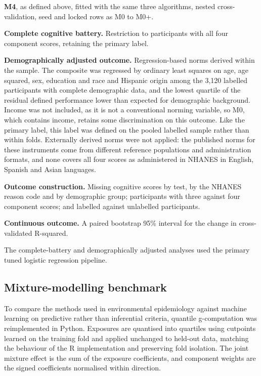 \documentclass[12pt]{article}
\begin{document}
\textbf{M4}, as defined above, fitted with the same three algorithms, nested cross-validation, seed and locked rows as M0 to M0+.

\textbf{Complete cognitive battery.} Restriction to participants with all four component scores, retaining the primary label.

\textbf{Demographically adjusted outcome.} Regression-based norms derived within the sample. The composite was regressed by ordinary least squares on age, age squared, sex, education and race and Hispanic origin among the 3,120 labelled participants with complete demographic data, and the lowest quartile of the residual defined performance lower than expected for demographic background. Income was not included, as it is not a conventional norming variable, so M0, which contains income, retains some discrimination on this outcome. Like the primary label, this label was defined on the pooled labelled sample rather than within folds. Externally derived norms were not applied: the published norms for these instruments come from different reference populations and administration formats, and none covers all four scores as administered in NHANES in English, Spanish and Asian languages.

\textbf{Outcome construction.} Missing cognitive scores by test, by the NHANES reason code and by demographic group; participants with three against four component scores; and labelled against unlabelled participants.

\textbf{Continuous outcome.} A paired bootstrap 95\% interval for the change in cross-validated R-squared.

The complete-battery and demographically adjusted analyses used the primary tuned logistic regression pipeline.

\subsection*{Mixture-modelling benchmark}

To compare the methods used in environmental epidemiology against machine learning on predictive rather than inferential criteria, quantile g-computation was reimplemented in Python. Exposures are quantised into quartiles using cutpoints learned on the training fold and applied unchanged to held-out data, matching the behaviour of the R implementation and preserving fold isolation. The joint mixture effect is the sum of the exposure coefficients, and component weights are the signed coefficients normalised within direction.
\end{document}
